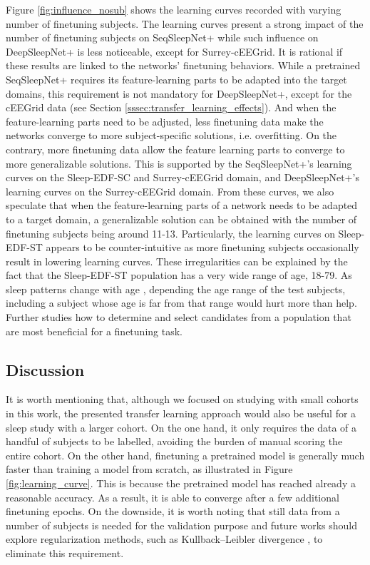 \documentclass[journal,twoside,web]{ieeecolor}
\begin{document}
Figure \ref{fig:influence_nosub}  shows the learning curves recorded with varying number of finetuning subjects. The learning curves present a strong impact of the number of finetuning subjects on SeqSleepNet+ while such influence on DeepSleepNet+ is less noticeable, except for Surrey-cEEGrid. It is rational if these results are linked to the networks' finetuning behaviors. While a pretrained SeqSleepNet+ requires its feature-learning parts to be adapted into the target domains, this requirement is not mandatory for DeepSleepNet+, except for the cEEGrid data (see Section \ref{sssec:transfer_learning_effects}). And when the feature-learning parts need to be adjusted, less finetuning data make the networks converge to more subject-specific solutions, i.e. overfitting. On the contrary, more finetuning data allow the feature learning parts to converge to more generalizable solutions. This is supported by the SeqSleepNet+'s learning curves on the Sleep-EDF-SC and Surrey-cEEGrid domain, and DeepSleepNet+'s learning curves on the Surrey-cEEGrid domain. From these curves, we also speculate that when the feature-learning parts of a network needs to be adapted to a target domain, a generalizable solution can be obtained with the number of finetuning subjects being around 11-13. Particularly, the learning curves on Sleep-EDF-ST appears to be counter-intuitive as more finetuning subjects occasionally result in lowering learning curves. These irregularities can be explained by the fact that the Sleep-EDF-ST population has a very wide range of age, 18-79. As sleep patterns change with age \cite{Skeldon2016}, depending the age range of the test subjects, including a subject whose age is far from that range would hurt more than help. Further studies how to determine and select candidates from a population that are most beneficial for a finetuning task.

\vspace{-0.25cm}
\subsection{Discussion}
It is worth mentioning that, although we focused on studying with small cohorts in this work, the presented transfer learning approach would also be useful for a sleep study with a larger cohort. On the one hand, it only requires the data of a handful of subjects to be labelled, avoiding the burden of manual scoring the entire cohort. On the other hand, finetuning a pretrained model is generally much faster than training a model from scratch, as illustrated in Figure \ref{fig:learning_curve}. This is because the pretrained model has reached already a reasonable accuracy. As a result, it is able to converge after a few additional finetuning epochs. On the downside, it is worth noting that still data from a number of subjects is needed for the validation purpose and future works should explore regularization methods, such as Kullback–Leibler divergence \cite{Phan2020a}, to eliminate this requirement.
\end{document}
